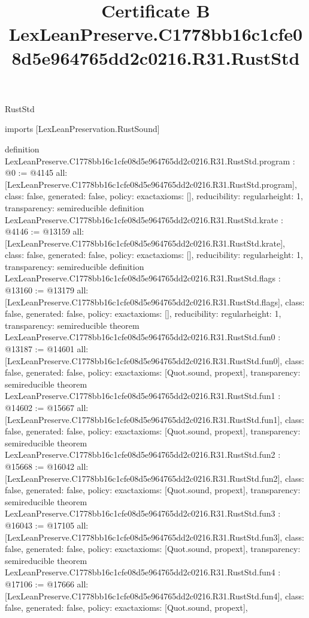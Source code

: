 \begin{lexlean}{RustStd}
\title{Certificate B LexLeanPreserve.C1778bb16c1cfe08d5e964765dd2c0216.R31.RustStd}
\begin{coremodule}
imports [LexLeanPreservation.RustSound]

definition LexLeanPreserve.C1778bb16c1cfe08d5e964765dd2c0216.R31.RustStd.program : @0 := @4145 {
  all: [LexLeanPreserve.C1778bb16c1cfe08d5e964765dd2c0216.R31.RustStd.program],
  class: false,
  generated: false,
  policy: exact{axioms: []},
  reducibility: regular{height: 1},
  transparency: semireducible
}
definition LexLeanPreserve.C1778bb16c1cfe08d5e964765dd2c0216.R31.RustStd.krate : @4146 := @13159 {
  all: [LexLeanPreserve.C1778bb16c1cfe08d5e964765dd2c0216.R31.RustStd.krate],
  class: false,
  generated: false,
  policy: exact{axioms: []},
  reducibility: regular{height: 1},
  transparency: semireducible
}
definition LexLeanPreserve.C1778bb16c1cfe08d5e964765dd2c0216.R31.RustStd.flags : @13160 := @13179 {
  all: [LexLeanPreserve.C1778bb16c1cfe08d5e964765dd2c0216.R31.RustStd.flags],
  class: false,
  generated: false,
  policy: exact{axioms: []},
  reducibility: regular{height: 1},
  transparency: semireducible
}
theorem LexLeanPreserve.C1778bb16c1cfe08d5e964765dd2c0216.R31.RustStd.fun0 : @13187 := @14601 {
  all: [LexLeanPreserve.C1778bb16c1cfe08d5e964765dd2c0216.R31.RustStd.fun0],
  class: false,
  generated: false,
  policy: exact{axioms: [Quot.sound, propext]},
  transparency: semireducible
}
theorem LexLeanPreserve.C1778bb16c1cfe08d5e964765dd2c0216.R31.RustStd.fun1 : @14602 := @15667 {
  all: [LexLeanPreserve.C1778bb16c1cfe08d5e964765dd2c0216.R31.RustStd.fun1],
  class: false,
  generated: false,
  policy: exact{axioms: [Quot.sound, propext]},
  transparency: semireducible
}
theorem LexLeanPreserve.C1778bb16c1cfe08d5e964765dd2c0216.R31.RustStd.fun2 : @15668 := @16042 {
  all: [LexLeanPreserve.C1778bb16c1cfe08d5e964765dd2c0216.R31.RustStd.fun2],
  class: false,
  generated: false,
  policy: exact{axioms: [Quot.sound, propext]},
  transparency: semireducible
}
theorem LexLeanPreserve.C1778bb16c1cfe08d5e964765dd2c0216.R31.RustStd.fun3 : @16043 := @17105 {
  all: [LexLeanPreserve.C1778bb16c1cfe08d5e964765dd2c0216.R31.RustStd.fun3],
  class: false,
  generated: false,
  policy: exact{axioms: [Quot.sound, propext]},
  transparency: semireducible
}
theorem LexLeanPreserve.C1778bb16c1cfe08d5e964765dd2c0216.R31.RustStd.fun4 : @17106 := @17666 {
  all: [LexLeanPreserve.C1778bb16c1cfe08d5e964765dd2c0216.R31.RustStd.fun4],
  class: false,
  generated: false,
  policy: exact{axioms: [Quot.sound, propext]},
}
\end{coremodule}
\end{lexlean}
